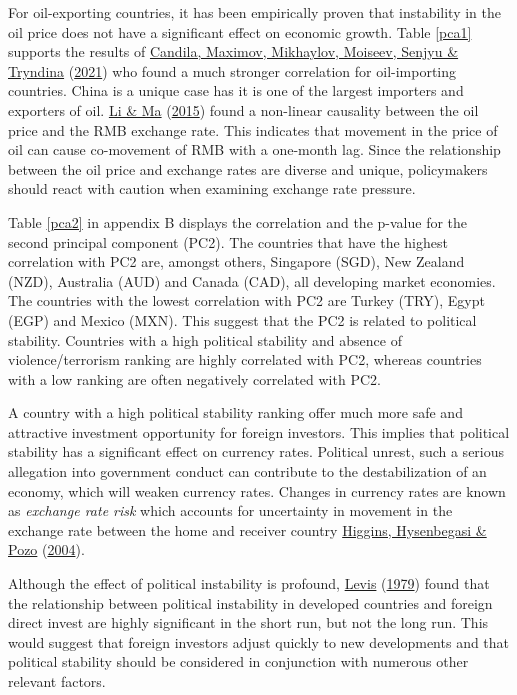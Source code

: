 \documentclass[11pt,preprint, authoryear]{elsarticle}
\numberwithin{equation}{section}
\numberwithin{figure}{section}
\numberwithin{table}{section}
\begin{document}
For oil-exporting countries, it has been empirically proven that
instability in the oil price does not have a significant effect on
economic growth. Table \ref{pca1} supports the results of
\protect\hyperlink{ref-can2021}{Candila, Maximov, Mikhaylov, Moiseev,
Senjyu \& Tryndina} (\protect\hyperlink{ref-can2021}{2021}) who found a
much stronger correlation for oil-importing countries. China is a unique
case has it is one of the largest importers and exporters of oil.
\protect\hyperlink{ref-li2015}{Li \& Ma}
(\protect\hyperlink{ref-li2015}{2015}) found a non-linear causality
between the oil price and the RMB exchange rate. This indicates that
movement in the price of oil can cause co-movement of RMB with a
one-month lag. Since the relationship between the oil price and exchange
rates are diverse and unique, policymakers should react with caution
when examining exchange rate pressure.

Table \ref{pca2} in appendix B displays the correlation and the p-value
for the second principal component (PC2). The countries that have the
highest correlation with PC2 are, amongst others, Singapore (SGD), New
Zealand (NZD), Australia (AUD) and Canada (CAD), all developing market
economies. The countries with the lowest correlation with PC2 are Turkey
(TRY), Egypt (EGP) and Mexico (MXN). This suggest that the PC2 is
related to political stability. Countries with a high political
stability and absence of violence/terrorism ranking are highly
correlated with PC2, whereas countries with a low ranking are often
negatively correlated with PC2.

A country with a high political stability ranking offer much more safe
and attractive investment opportunity for foreign investors. This
implies that political stability has a significant effect on currency
rates. Political unrest, such a serious allegation into government
conduct can contribute to the destabilization of an economy, which will
weaken currency rates. Changes in currency rates are known as
\emph{exchange rate risk} which accounts for uncertainty in movement in
the exchange rate between the home and receiver country
\protect\hyperlink{ref-higg}{Higgins, Hysenbegasi \& Pozo}
(\protect\hyperlink{ref-higg}{2004}).

Although the effect of political instability is profound,
\protect\hyperlink{ref-levis}{Levis}
(\protect\hyperlink{ref-levis}{1979}) found that the relationship
between political instability in developed countries and foreign direct
invest are highly significant in the short run, but not the long run.
This would suggest that foreign investors adjust quickly to new
developments and that political stability should be considered in
conjunction with numerous other relevant factors.
\end{document}
